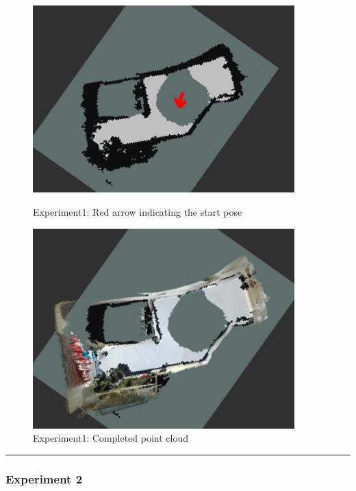 \documentclass{mproj}
\begin{document}
\begin{figure}
    \centering
    \begin{minipage}{0.45\textwidth}
        \centering
        \includegraphics[width=0.9\textwidth]{images/exp1map.png} %
        \caption{Experiment1: Red arrow indicating the start pose}
    \end{minipage}\hfill
    \begin{minipage}{0.45\textwidth}
        \centering
        \includegraphics[width=0.9\textwidth]{images/ex1pc.png} %
        \caption{Experiment1: Completed point cloud}
    \end{minipage}
\end{figure}

\noindent\rule{15cm}{0.8pt}
\subsubsection{Experiment 2}
\end{document}
